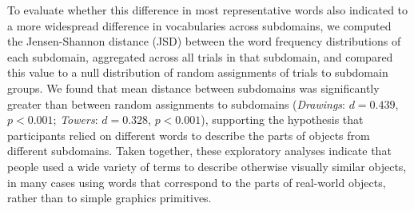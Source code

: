 \documentclass[10pt,letterpaper]{article}
\begin{document}
To evaluate whether this difference in most representative words also indicated to a more widespread difference in vocabularies across subdomains, we computed the Jensen-Shannon distance (JSD) between the word frequency distributions of each subdomain, aggregated across all trials in that subdomain, and compared this value to a null distribution of random assignments of trials to subdomain groups.
We found that mean distance between subdomains was significantly greater than between random assignments to subdomains (\textit{Drawings}: $d = 0.439$, $p < 0.001$; \textit{Towers}: $d = 0.328$, $p < 0.001$), supporting the hypothesis that participants relied on different words to describe the parts of objects from different subdomains.
Taken together, these exploratory analyses indicate that people used a wide variety of terms to describe otherwise visually similar objects, in many cases using words that correspond to the parts of real-world objects, rather than to simple graphics primitives.



\end{document}
